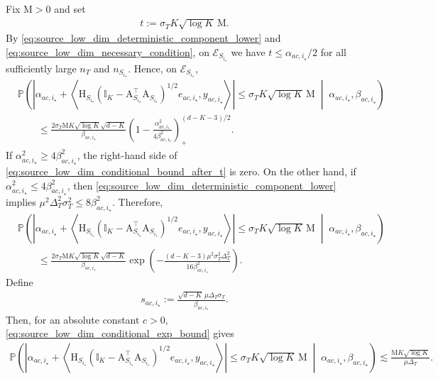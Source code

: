 \documentclass[10pt]{article}
\newcommand{\Id}{\mathbb I}
\newcommand{\trg}{T}
\newcommand{\nT}{n_{\trg}}
\newcommand{\sigmaT}{\sigma_{\trg}}
\newcommand{\DeltaT}{\Delta_{\trg}}
\newcommand{\src}{S}
\newcommand{\nSm}[1]{n_{\src_{#1}}}
\begin{document}
Fix $\mathrm M>0$ and set
\begin{align}
    t:=\sigmaT K\sqrt{\log K}\,\mathrm M.
\end{align}
By \eqref{eq:source_low_dim_deterministic_component_lower} and \eqref{eq:source_low_dim_necessary_condition}, on $\mathcal E_{\src_{i_\star}}$ we have $t\le \alpha_{ac,i_\star}/2$ for all sufficiently large $\nT$ and $\nSm{i_\star}$. Hence, on $\mathcal E_{\src_{i_\star}}$,
\begin{align}
\label{eq:source_low_dim_conditional_bound_after_t}
    &\mathbb P\left(\left|\alpha_{ac,i_\star}+\left\langle \mathrm H_{\src_{i_\star}}\left(\Id_K-\mathrm A_{\src_{i_\star}}^\top\mathrm A_{\src_{i_\star}}\right)^{1/2}e_{ac,i_\star},y_{ac,i_\star}\right\rangle\right|\le \sigmaT K\sqrt{\log K}\,\mathrm M\;\middle|\;\alpha_{ac,i_\star},\beta_{ac,i_\star}\right)\\
    &\qquad\le \frac{2\sigmaT\mathrm M K\sqrt{\log K}\sqrt{d-K}}{\beta_{ac,i_\star}}\left(1-\frac{\alpha_{ac,i_\star}^2}{4\beta_{ac,i_\star}^2}\right)_+^{(d-K-3)/2}.
\end{align}
If $\alpha_{ac,i_\star}^2\ge 4\beta_{ac,i_\star}^2$, the right-hand side of \eqref{eq:source_low_dim_conditional_bound_after_t} is zero. On the other hand, if $\alpha_{ac,i_\star}^2\le 4\beta_{ac,i_\star}^2$, then \eqref{eq:source_low_dim_deterministic_component_lower} implies $\mu^2\DeltaT^2\sigmaT^2\le 8\beta_{ac,i_\star}^2$. Therefore,
\begin{align}
\label{eq:source_low_dim_conditional_exp_bound}
    &\mathbb P\left(\left|\alpha_{ac,i_\star}+\left\langle \mathrm H_{\src_{i_\star}}\left(\Id_K-\mathrm A_{\src_{i_\star}}^\top\mathrm A_{\src_{i_\star}}\right)^{1/2}e_{ac,i_\star},y_{ac,i_\star}\right\rangle\right|\le \sigmaT K\sqrt{\log K}\,\mathrm M\;\middle|\;\alpha_{ac,i_\star},\beta_{ac,i_\star}\right)\\
    &\qquad\le \frac{2\sigmaT\mathrm M K\sqrt{\log K}\sqrt{d-K}}{\beta_{ac,i_\star}}\exp\left(-\frac{(d-K-3)\mu^2\sigmaT^2\DeltaT^2}{16\beta_{ac,i_\star}^2}\right).
\end{align}
Define
\begin{align}
    s_{ac,i_\star}:=\frac{\sqrt{d-K}\,\mu\DeltaT\sigmaT}{\beta_{ac,i_\star}}.
\end{align}
Then, for an absolute constant $c>0$, \eqref{eq:source_low_dim_conditional_exp_bound} gives
\begin{align}
\label{eq:source_low_dim_pair_small_ball_final}
    \mathbb P\left(\left|\alpha_{ac,i_\star}+\left\langle \mathrm H_{\src_{i_\star}}\left(\Id_K-\mathrm A_{\src_{i_\star}}^\top\mathrm A_{\src_{i_\star}}\right)^{1/2}e_{ac,i_\star},y_{ac,i_\star}\right\rangle\right|\le \sigmaT K\sqrt{\log K}\,\mathrm M\;\middle|\;\alpha_{ac,i_\star},\beta_{ac,i_\star}\right)\lesssim \frac{\mathrm M K\sqrt{\log K}}{\mu\DeltaT}.
\end{align}
\end{document}
